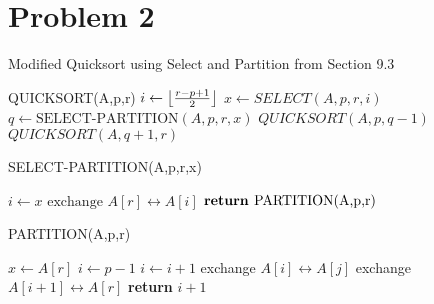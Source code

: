 \documentclass[11pt]{article}
\DeclarePairedDelimiter\floor{\lfloor}{\rfloor}
\begin{document}
	\section*{Problem 2}
		\begin{algorithm}[H]
			\caption{Modified Quicksort using Select and Partition from Section 9.3}
			\begin{algorithmic}[1]
				\State	QUICKSORT(A,p,r)
					\State	$i\leftarrow \floor[\big]{\frac{r-p+1}{2}}$
					\State $x\leftarrow SELECT(A,p,r,i)$ 
					\State $q\leftarrow \text{SELECT-PARTITION}(A,p,r,x)$
					\State $QUICKSORT(A,p,q-1)$
					\State $QUICKSORT(A,q+1,r)$
					\EndIf
			\end{algorithmic}
		\end{algorithm}
		\begin{algorithm}[H]
			\caption{SELECT-PARTITION(A,p,r,x)}
			\begin{algorithmic}[1]
				\State $i\leftarrow x$
				\State $\text{exchange } A[r]\leftrightarrow A[i]$
				\State $\text{\textbf{return }PARTITION(A,p,r)}$
			\end{algorithmic}
		\end{algorithm}
		\begin{algorithm}[H]
			\caption{PARTITION(A,p,r)}
			\begin{algorithmic}[1]
				\State $x\leftarrow A[r]$
				\State $i\leftarrow p-1$
						\State $i\leftarrow i+1$
						\State exchange $A[i]\leftrightarrow A[j]$
					\EndIf
				\EndFor
				\State exchange $A[i+1]\leftrightarrow A[r]$
				\State \textbf{return } $i+1$
			\end{algorithmic}
		\end{algorithm}
\end{document}
